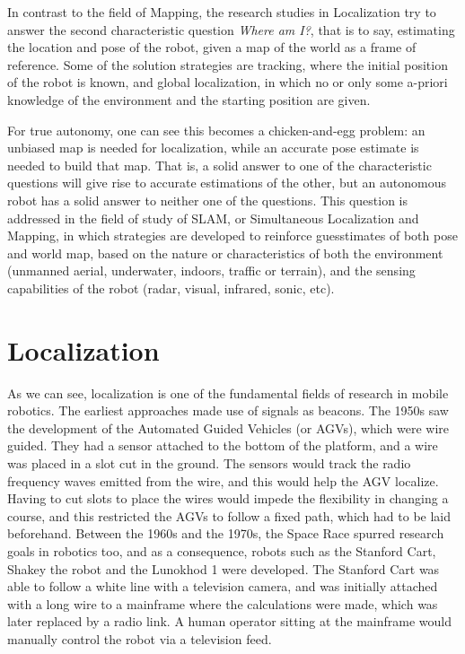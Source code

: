 In contrast to the field of Mapping, the research studies in Localization try to answer the second characteristic question \emph{Where am I?},
that is to say, estimating the location and pose of the robot, given a map of the world as a frame of reference. Some of the solution strategies
are tracking, where the initial position of the robot is known, and global localization, in which no or only some a-priori knowledge of the 
environment and the starting position are given.

For true autonomy, one can see this becomes a chicken-and-egg problem: an unbiased map is needed for localization, while an accurate pose
estimate is needed to build that map. That is, a solid answer to one of the characteristic questions will give rise to accurate estimations
of the other, but an autonomous robot has a solid answer to neither one of the questions. This question is addressed in the field of study of 
SLAM, or Simultaneous Localization and Mapping, in which strategies are developed to reinforce guesstimates of both pose and world map, based on
the nature or characteristics of both the environment (unmanned aerial, underwater, indoors, traffic or terrain), and the sensing capabilities of
the robot (radar, visual, infrared, sonic, etc).

\section{Localization}
\label{sec:robo-local}
As we can see, localization is one of the fundamental fields of research in mobile robotics. The earliest approaches made use of signals as
beacons. The 1950s saw the development of the Automated Guided Vehicles (or AGVs), which were wire guided. They had a sensor attached to the 
bottom of the platform, and a wire was placed in a slot cut in the ground. The sensors would track the radio frequency waves emitted from the
wire, and this would help the AGV localize. Having to cut slots to place the wires would impede the flexibility in changing a course, and 
this restricted the AGVs to follow a fixed path, which had to be laid beforehand. Between the 1960s and the 1970s, the Space Race spurred 
research goals in robotics too, and as a consequence, robots such as the Stanford Cart, Shakey the robot and the Lunokhod 1 were developed. 
The Stanford Cart was able to follow a white line with a television camera, and was initially attached with a long wire to a mainframe
where the calculations were made, which was later replaced by a radio link. A human operator sitting at the mainframe would manually 
control the robot via a television feed. 


